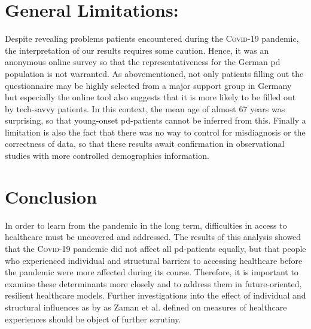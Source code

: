 \documentclass{bmcart}
\begin{document}

\section*{General Limitations:}
Despite revealing problems patients encountered during the \textsc{Covid}-19 pandemic, the interpretation of our results requires some caution. Hence, it was an anonymous online survey so that the representativeness for the German \ac{pd} population is not warranted. As abovementioned, not only patients filling out the questionnaire may be highly selected from a major support group in Germany but especially the online tool also suggests that it is more likely to be filled out by tech-savvy patients. In this context, the mean age of almost 67 years was surprising, so that young-onset \ac{pd}-patients cannot be inferred from this. Finally a limitation is also the fact that there was no way to control for misdiagnosis or the correctness of data, so that these results await confirmation in observational studies with more controlled demographics information.

\section*{Conclusion}
In order to learn from the pandemic in the long term, difficulties in access to healthcare must be uncovered and addressed. The results of this analysis showed that the \textsc{Covid}-19 pandemic did not affect all \ac{pd}-patients equally, but that people who experienced individual and structural barriers to accessing healthcare before the pandemic were more affected during its course. Therefore, it is important to examine these determinants more closely and to address them in future-oriented, resilient healthcare models. Further investigations into the effect of individual and structural influences as by as Zaman et al. defined on measures of healthcare experiences should be object of further scrutiny.


\end{document}
